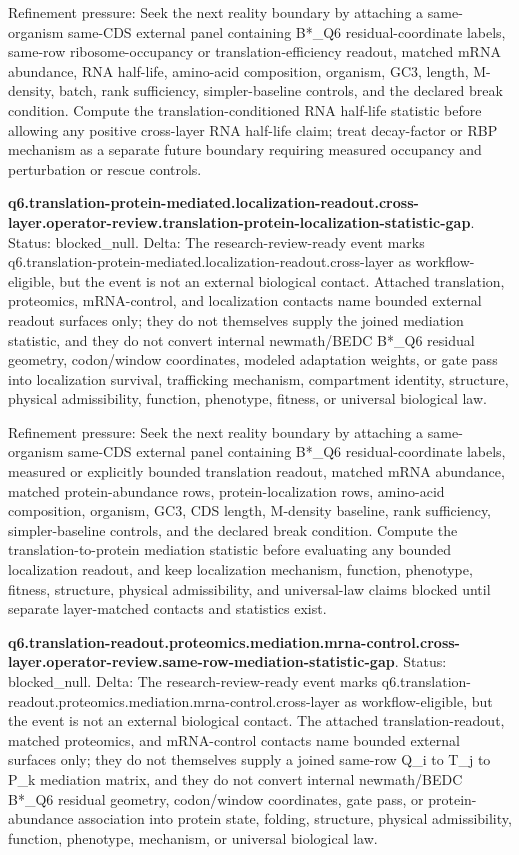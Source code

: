 Refinement pressure: Seek the next reality boundary by attaching a same-organism same-CDS external panel containing B*\_Q6 residual-coordinate labels, same-row ribosome-occupancy or translation-efficiency readout, matched mRNA abundance, RNA half-life, amino-acid composition, organism, GC3, length, M-density, batch, rank sufficiency, simpler-baseline controls, and the declared break condition. Compute the translation-conditioned RNA half-life statistic before allowing any positive cross-layer RNA half-life claim; treat decay-factor or RBP mechanism as a separate future boundary requiring measured occupancy and perturbation or rescue controls.

\textbf{q6.translation-protein-mediated.localization-readout.cross-layer.operator-review.translation-protein-localization-statistic-gap}. Status: blocked\_null. Delta: The research-review-ready event marks q6.translation-protein-mediated.localization-readout.cross-layer as workflow-eligible, but the event is not an external biological contact. Attached translation, proteomics, mRNA-control, and localization contacts name bounded external readout surfaces only; they do not themselves supply the joined mediation statistic, and they do not convert internal newmath/BEDC B*\_Q6 residual geometry, codon/window coordinates, modeled adaptation weights, or gate pass into localization survival, trafficking mechanism, compartment identity, structure, physical admissibility, function, phenotype, fitness, or universal biological law.

Refinement pressure: Seek the next reality boundary by attaching a same-organism same-CDS external panel containing B*\_Q6 residual-coordinate labels, measured or explicitly bounded translation readout, matched mRNA abundance, matched protein-abundance rows, protein-localization rows, amino-acid composition, organism, GC3, CDS length, M-density baseline, rank sufficiency, simpler-baseline controls, and the declared break condition. Compute the translation-to-protein mediation statistic before evaluating any bounded localization readout, and keep localization mechanism, function, phenotype, fitness, structure, physical admissibility, and universal-law claims blocked until separate layer-matched contacts and statistics exist.

\textbf{q6.translation-readout.proteomics.mediation.mrna-control.cross-layer.operator-review.same-row-mediation-statistic-gap}. Status: blocked\_null. Delta: The research-review-ready event marks q6.translation-readout.proteomics.mediation.mrna-control.cross-layer as workflow-eligible, but the event is not an external biological contact. The attached translation-readout, matched proteomics, and mRNA-control contacts name bounded external surfaces only; they do not themselves supply a joined same-row Q\_i to T\_j to P\_k mediation matrix, and they do not convert internal newmath/BEDC B*\_Q6 residual geometry, codon/window coordinates, gate pass, or protein-abundance association into protein state, folding, structure, physical admissibility, function, phenotype, mechanism, or universal biological law.

